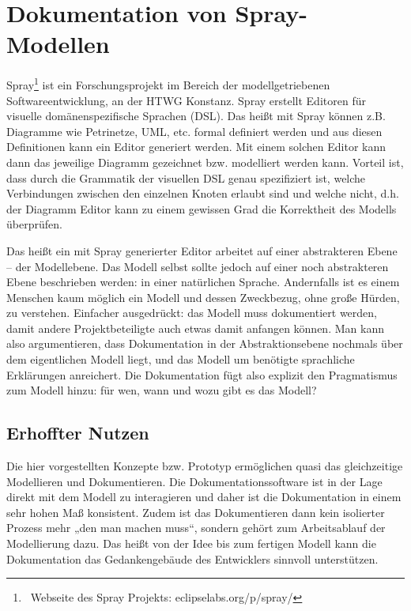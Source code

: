 \section{Dokumentation von Spray-Modellen}\label{doku-spray}
 
Spray\footnote{~Webseite des Spray Projekts: eclipselabs.org/p/spray/} ist ein Forschungsprojekt im Bereich der modellgetriebenen Softwareentwicklung, an der HTWG Konstanz. Spray erstellt Editoren für visuelle domänenspezifische Sprachen (DSL). Das heißt mit Spray können z.B. Diagramme wie Petrinetze, UML, etc. formal definiert werden und aus diesen Definitionen kann ein Editor generiert werden. Mit einem solchen Editor kann dann das jeweilige Diagramm gezeichnet bzw. modelliert werden kann. Vorteil ist, dass durch die Grammatik der visuellen DSL genau spezifiziert ist, welche Verbindungen zwischen den einzelnen Knoten erlaubt sind und welche nicht, d.h. der Diagramm Editor kann zu einem gewissen Grad die Korrektheit des Modells überprüfen.

 
Das heißt ein mit Spray generierter Editor arbeitet auf einer abstrakteren Ebene -- der Modellebene. Das Modell selbst sollte jedoch auf einer noch abstrakteren Ebene beschrieben werden: in einer natürlichen Sprache. Andernfalls ist es einem Menschen kaum möglich ein Modell und dessen Zweckbezug, ohne große Hürden, zu verstehen. Einfacher ausgedrückt: das Modell muss dokumentiert werden, damit andere Projektbeteiligte auch etwas damit anfangen können. Man kann also argumentieren, dass Dokumentation in der Abstraktionsebene nochmals über dem eigentlichen Modell liegt, und das Modell um benötigte sprachliche Erklärungen anreichert. Die Dokumentation fügt also explizit den Pragmatismus zum Modell hinzu: für wen, wann und wozu gibt es das Modell?

 
\subsection{Erhoffter Nutzen}\label{}
 
Die hier vorgestellten Konzepte bzw. Prototyp ermöglichen quasi das gleichzeitige Modellieren und Dokumentieren. Die Dokumentationssoftware ist in der Lage direkt mit dem Modell zu interagieren und daher ist die Dokumentation in einem sehr hohen Maß konsistent. Zudem ist das Dokumentieren dann kein isolierter Prozess mehr „den man machen muss“, sondern gehört zum Arbeitsablauf der Modellierung dazu. Das heißt von der Idee bis zum fertigen Modell kann die Dokumentation das Gedankengebäude des Entwicklers sinnvoll unterstützen.

